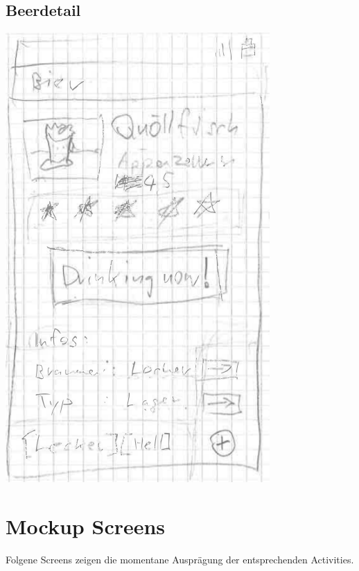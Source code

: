 \documentclass[10pt,a4paper]{scrartcl}
\begin{document}
\subsection{Beerdetail}
\includegraphics[scale=.5]{bierdetail-skizze.png}

\section{Mockup Screens}
Folgene Screens zeigen die momentane Ausprägung der entsprechenden Activities.
\end{document}
